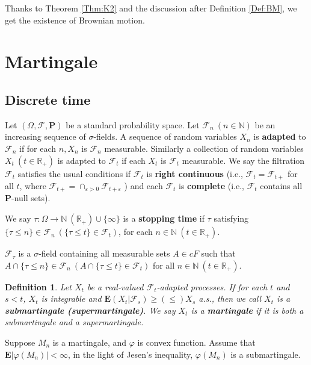\documentclass[twoside, 12pt]{book}
\numberwithin{equation}{chapter}
\newtheorem{definition}[theorem]{Definition}
\def\cF{{\mathcal F}}
\def\mN{{\mathbb N}}
\def\mR{{\mathbb R}}
\def\bE{{\mathbf E}}
\def\bP{{\mathbf P}}
\def\bT{{\mathbf T}}
\def\geq{\geqslant}
\def\leq{\leqslant}
\begin{document}
	Thanks to Theorem \ref{Thm:K2} and the discussion after Definition \ref{Def:BM}, we get the existence of Brownian motion. 
	
	
	\section{Martingale}
	
	
	\subsection{Discrete time}
	
	
	Let $(\Omega, \cF, \bP)$ be a standard probability space. Let $\mathcal{F}_n\ (n\in \mN)$ be an increasing sequence of $\sigma$-fields. A sequence of random variables $X_n$ is {\bf adapted} to $\mathcal{F}_n$ if for each $n, X_n$ is $\mathcal{F}_n$ measurable. Similarly a collection of random variables $X_t\ (t\in \mR_+)$ is adapted to $\mathcal{F}_t$ if each $X_t$ is $\mathcal{F}_t$ measurable. We say the filtration $\mathcal{F}_t$ satisfies the usual conditions if $\mathcal{F}_t$ is {\bf right continuous} (i.e., $\mathcal{F}_t=\mathcal{F}_{t+}$ for all $t$, where $\mathcal{F}_{t+}=\cap_{\varepsilon>0} \mathcal{F}_{t+\varepsilon}$ ) and each $\mathcal{F}_t$ is {\bf complete} (i.e., $\mathcal{F}_t$ contains all $\mathbf{P}$-null sets). %
	 
	We say $\tau: \Omega\to \mN \ (\mR_+) \cup\{\infty\}$ is a {\bf stopping time} if $\tau$ satisfying $\{\tau\leq n\}\in \cF_n \ (\{\tau\leq t\}\in \cF_t)$, for each $n\in \mN \ (t\in \mR_+)$.  
	 
	$\mathcal{F}_\tau$ is a $\sigma$-field containing all measurable sets $A\in cF$ such that $A \cap \{\tau \leq n\} \in \mathcal{F}_n\ (A \cap \{\tau \leq t\} \in\cF_t)$ for all $n\in \mN\ (t \in \mR_+)$. 
		
	\begin{definition}
		Let $X_t$ be a real-valued $\cF_t$-adapted processes. If for each $t$ and $s<t$, $X_t$ is integrable and $\bE(X_t | \cF_s) \geq (\leq) X_s$ a.s., then we call $X_t$ is a {\bf submartingale (supermartingale)}. We say $X_t$ is a {\bf martingale} if it is both a submartingale and a supermartingale. 
	\end{definition}
	Suppose $M_n$ is a martingale, and $\varphi$ is convex function. Assume that $\bE |\varphi(M_n)|<\infty$, in the light of Jesen's inequality, $\varphi(M_n)$ is a submartingale. 
	
\end{document}
